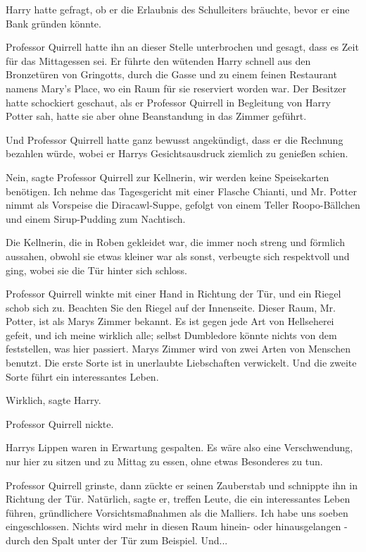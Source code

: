Harry hatte gefragt, ob er die Erlaubnis des Schulleiters bräuchte, bevor er
eine Bank gründen könnte.

Professor Quirrell hatte ihn an dieser Stelle unterbrochen und gesagt, dass es
Zeit für das Mittagessen sei. Er führte den wütenden Harry schnell aus den
Bronzetüren von Gringotts, durch die Gasse und zu einem feinen Restaurant namens
Mary's Place, wo ein Raum für sie reserviert worden war. Der Besitzer hatte
schockiert geschaut, als er Professor Quirrell in Begleitung von Harry Potter
sah, hatte sie aber ohne Beanstandung in das Zimmer geführt.

Und Professor Quirrell hatte ganz bewusst angekündigt, dass er die Rechnung
bezahlen würde, wobei er Harrys Gesichtsausdruck ziemlich zu genießen schien.

\glqq{}Nein\grqq{}, sagte Professor Quirrell zur Kellnerin, \glqq{}wir werden
keine Speisekarten benötigen. Ich nehme das Tagesgericht mit einer Flasche
Chianti, und Mr. Potter nimmt als Vorspeise die Diracawl-Suppe, gefolgt von
einem Teller Roopo-Bällchen und einem Sirup-Pudding zum Nachtisch.\grqq{}

Die Kellnerin, die in Roben gekleidet war, die immer noch streng und förmlich
aussahen, obwohl sie etwas kleiner war als sonst, verbeugte sich respektvoll und
ging, wobei sie die Tür hinter sich schloss.

Professor Quirrell winkte mit einer Hand in Richtung der Tür, und ein Riegel
schob sich zu. \glqq{}Beachten Sie den Riegel auf der Innenseite. Dieser Raum,
Mr. Potter, ist als Marys Zimmer bekannt. Es ist gegen jede Art von Hellseherei
gefeit, und ich meine wirklich alle; selbst Dumbledore könnte nichts von dem
feststellen, was hier passiert. Marys Zimmer wird von zwei Arten von Menschen
benutzt. Die erste Sorte ist in unerlaubte Liebschaften verwickelt. Und die
zweite Sorte führt ein interessantes Leben.\grqq{}

\glqq{}Wirklich\grqq{}, sagte Harry.

Professor Quirrell nickte.

Harrys Lippen waren in Erwartung gespalten. \glqq{}Es wäre also eine
Verschwendung, nur hier zu sitzen und zu Mittag zu essen, ohne etwas Besonderes
zu tun.\grqq{}

Professor Quirrell grinste, dann zückte er seinen Zauberstab und schnippte ihn
in Richtung der Tür. \glqq{}Natürlich\grqq{}, sagte er, \glqq{}treffen Leute,
die ein interessantes Leben führen, gründlichere Vorsichtsmaßnahmen als die
Malliers. Ich habe uns soeben eingeschlossen. Nichts wird mehr in diesen Raum
hinein- oder hinausgelangen - durch den Spalt unter der Tür zum Beispiel.
Und...\grqq{}

